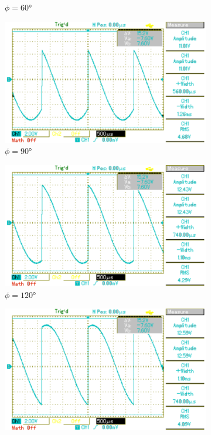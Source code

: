 \begin{figure}[p]
\begin{subfigure}{0.32\textwidth}
		\caption{$\phi=60°$}
	\end{subfigure}
	\begin{subfigure}{0.32\textwidth}
		\includegraphics[width=\textwidth]{Bilder/MAP008.pdf}
		\caption{$\phi=90°$}
	\end{subfigure}
	\begin{subfigure}{0.32\textwidth}
		\includegraphics[width=\textwidth]{Bilder/MAP009.pdf}
		\caption{$\phi=120°$}
	\end{subfigure}
	\begin{subfigure}{0.32\textwidth}
		\includegraphics[width=\textwidth]{Bilder/MAP010.pdf}

\end{subfigure}
\end{figure}
